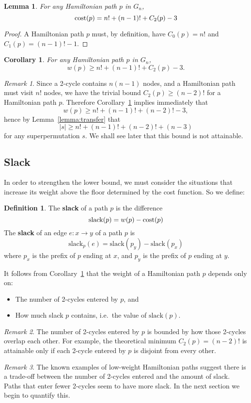 \documentclass[a4paper]{article}
\newtheorem{lemma}{Lemma}
\newtheorem{cor}{Corollary}
\theoremstyle{definition}
\newtheorem{defn}{Definition}[section]
\theoremstyle{remark}
\newtheorem*{remark}{Remark}
\let\definiendum\textbf
\begin{document}
\begin{lemma}\label{lem:Ham}
    For any Hamiltonian path $p$ in $G_n$,
    \[
        \mathrm{cost}(p) = n! + (n-1)! + C_2(p) - 3
    \]
\end{lemma}
\begin{proof}
    A Hamiltonian path $p$ must, by definition, have $C_0(p)=n!$ and $C_1(p)=(n-1)!-1$.
\end{proof}
\begin{cor}\label{cor:Ham}
    For any Hamiltonian path $p$ in $G_n$,
    \[
        w(p) \ge n! + (n-1)! + C_2(p) - 3.
    \]
\end{cor}
\begin{remark}
    Since a 2-cycle contains $n(n-1)$ nodes, and a Hamiltonian path must visit $n!$ nodes, we have the trivial bound $C_2(p)\ge(n-2)!$ for a Hamiltonian path $p$. Therefore Corollary~\ref{cor:Ham} implies immediately that
    \[
        w(p) \ge n! + (n-1)! + (n-2)! - 3,
    \]
    hence by Lemma~\ref{lemma:transfer} that
    \[
        |s| \ge n! + (n-1)! + (n-2)! + (n - 3)
    \]
    for any superpermutation $s$. We shall see later that this bound is not attainable.
\end{remark}
\subsection{Slack}
\def\slack{\mathrm{slack}}
In order to strengthen the lower bound, we must consider the situations that increase its weight above the floor determined by the cost function. So we define:
\begin{defn}\label{def:slack}
    The \definiendum{slack} of a path $p$ is the difference
    \[
        \slack(p) = w(p) - \cost(p)
    \]
    The \definiendum{slack} of an edge $e: x\to y$ of a path $p$ is
    \[
        \slack_p(e) = \slack(p_y) - \slack(p_x)
    \]
    where $p_x$ is the prefix of $p$ ending at $x$, and $p_y$ is the prefix of $p$ ending at $y$.
\end{defn}

It follows from Corollary~\ref{cor:Ham} that the weight of a Hamiltonian path $p$ depends only on:
\begin{itemize}
    \item The number of 2-cycles entered by $p$, and
    \item How much slack $p$ contains, i.e.\ the value of $\slack(p)$.
\end{itemize}

\begin{remark}
    The number of 2-cycles entered by $p$ is bounded by how those 2-cycles overlap each other. For example, the theoretical minimum $C_2(p)=(n-2)!$ is attainable only if each 2-cycle entered by $p$ is disjoint from every other.
\end{remark}
\begin{remark}
    The known examples of low-weight Hamiltonian paths suggest there is a trade-off between the number of 2-cycles entered and the amount of slack. Paths that enter fewer 2-cycles seem to have more slack. In the next section we begin to quantify this.
\end{remark}
\end{document}
